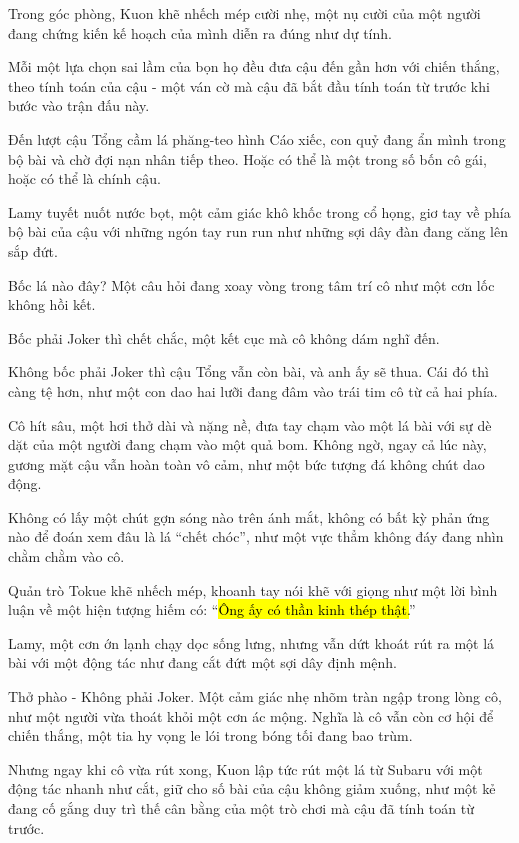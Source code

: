 \documentclass[../main.tex]{subfiles}
\begin{document}
Trong góc phòng, Kuon khẽ nhếch mép cười nhẹ, một nụ cười của một người đang chứng kiến kế hoạch của mình diễn ra đúng như dự tính.

Mỗi một lựa chọn sai lầm của bọn họ đều đưa cậu đến gần hơn với chiến thắng, theo tính toán của cậu - một ván cờ mà cậu đã bắt đầu tính toán từ trước khi bước vào trận đấu này.

\il

Đến lượt cậu Tổng cầm lá phăng-teo hình Cáo xiếc, con quỷ đang ẩn mình trong bộ bài và chờ đợi nạn nhân tiếp theo. Hoặc có thể là một trong số bốn cô gái, hoặc có thể là chính cậu.

Lamy tuyết nuốt nước bọt, một cảm giác khô khốc trong cổ họng, giơ tay về phía bộ bài của cậu với những ngón tay run run như những sợi dây đàn đang căng lên sắp đứt.

Bốc lá nào đây? Một câu hỏi đang xoay vòng trong tâm trí cô như một cơn lốc không hồi kết.

Bốc phải Joker thì chết chắc, một kết cục mà cô không dám nghĩ đến.

Không bốc phải Joker thì cậu Tổng vẫn còn bài, và anh ấy sẽ thua. Cái đó thì càng tệ hơn, như một con dao hai lưỡi đang đâm vào trái tim cô từ cả hai phía.

Cô hít sâu, một hơi thở dài và nặng nề, đưa tay chạm vào một lá bài với sự dè dặt của một người đang chạm vào một quả bom. Không ngờ, ngay cả lúc này, gương mặt cậu vẫn hoàn toàn vô cảm, như một bức tượng đá không chút dao động.

Không có lấy một chút gợn sóng nào trên ánh mắt, không có bất kỳ phản ứng nào để đoán xem đâu là lá ``chết chóc'', như một vực thẳm không đáy đang nhìn chằm chằm vào cô.

Quản trò Tokue khẽ nhếch mép, khoanh tay nói khẽ với giọng như một lời bình luận về một hiện tượng hiếm có: ``\hl{Ông ấy có thần kinh thép thật.}''

Lamy, một cơn ớn lạnh chạy dọc sống lưng, nhưng vẫn dứt khoát rút ra một lá bài với một động tác như đang cắt đứt một sợi dây định mệnh.

Thở phào - Không phải Joker. Một cảm giác nhẹ nhõm tràn ngập trong lòng cô, như một người vừa thoát khỏi một cơn ác mộng. Nghĩa là cô vẫn còn cơ hội để chiến thắng, một tia hy vọng le lói trong bóng tối đang bao trùm.

Nhưng ngay khi cô vừa rút xong, Kuon lập tức rút một lá từ Subaru với một động tác nhanh như cắt, giữ cho số bài của cậu không giảm xuống, như một kẻ đang cố gắng duy trì thế cân bằng của một trò chơi mà cậu đã tính toán từ trước.
\end{document}
